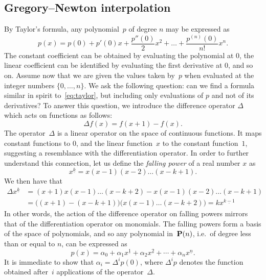 \subsection{Gregory--Newton interpolation}
By Taylor's formula,
any polynomial~$p$ of degree $n$ may be expressed as
\begin{equation}
    \label{eq:taylor}
    p(x) = p(0) + p'(0) x + \frac{p''(0)}{2} x^2 + \dotsc + \frac{p^{(n)}(0)}{n!} x^n.
\end{equation}
The constant coefficient can be obtained by evaluating the polynomial at 0,
the linear coefficient can be identified by evaluating the first derivative at 0,
and so on.
Assume now that we are given the values taken by~$p$ when evaluated at the integer numbers $\{0, \dotsc, n\}$.
We ask the following question:
can we find a formula similar in spirit to~\eqref{eq:taylor},
but including only evaluations of $p$ and not of its derivatives?
To answer this question, we introduce the difference operator $\Delta$ which acts on functions as follows:
\[
    \Delta f(x) = f(x+1) - f(x).
\]
The operator~$\Delta$ is a linear operator on the space of continuous functions.
It maps constant functions to 0,
and the linear function~$x$ to the constant function~$1$,
suggesting a resemblance with the differentiation operator.
In order to further understand this connection,
let us define the \emph{falling power} of a real number $x$ as
\[
    x^{\underline{k}} = x (x-1) (x-2) \dots (x-k+1).
\]
We then have that
\begin{align*}
    \Delta x^{\underline{k}}
    &= (x+1) x (x-1) \dots (x-k+2) - x (x-1) (x-2) \dots (x-k+1) \\
    &= \bigl((x+1) - (x-k+1)\bigr) \bigl(x (x-1) \dots (x-k+2)\bigr) = k x^{\underline{k-1}}
\end{align*}
In other words,
the action of the difference operator on falling powers mirrors that of the differentiation operator on monomials.
The falling powers form a basis of the space of polynomials,
and so any polynomial in~$\mathbf P(n)$, i.e.\ of degree less than or equal to $n$, can be expressed as
\begin{equation}
    \label{eq:gregory_newton}
    p(x) = \alpha_0 + \alpha_1 x^{\underline{1}} + \alpha_2 x^{\underline{2}} + \dotsb + \alpha_n x^{\underline{n}}.
\end{equation}
It is immediate to show that $\alpha_i = \Delta^i p(0)$,
where $\Delta^i p$ denotes the function obtained after~$i$ applications of the operator~$\Delta$.
